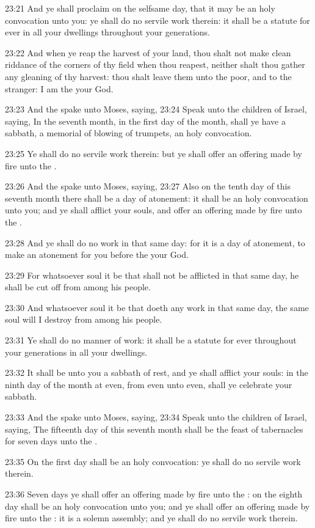 23:21 And ye shall proclaim on the selfsame day, that it may be an holy convocation unto you: ye shall do no servile work therein: it shall be a statute for ever in all your dwellings throughout your generations.

23:22 And when ye reap the harvest of your land, thou shalt not make clean riddance of the corners of thy field when thou reapest, neither shalt thou gather any gleaning of thy harvest: thou shalt leave them unto the poor, and to the stranger: I am the \LORD your God.

23:23 And the \LORD spake unto Moses, saying, 23:24 Speak unto the children of Israel, saying, In the seventh month, in the first day of the month, shall ye have a sabbath, a memorial of blowing of trumpets, an holy convocation.

23:25 Ye shall do no servile work therein: but ye shall offer an offering made by fire unto the \LORD.

23:26 And the \LORD spake unto Moses, saying, 23:27 Also on the tenth day of this seventh month there shall be a day of atonement: it shall be an holy convocation unto you; and ye shall afflict your souls, and offer an offering made by fire unto the \LORD.

23:28 And ye shall do no work in that same day: for it is a day of atonement, to make an atonement for you before the \LORD your God.

23:29 For whatsoever soul it be that shall not be afflicted in that same day, he shall be cut off from among his people.

23:30 And whatsoever soul it be that doeth any work in that same day, the same soul will I destroy from among his people.

23:31 Ye shall do no manner of work: it shall be a statute for ever throughout your generations in all your dwellings.

23:32 It shall be unto you a sabbath of rest, and ye shall afflict your souls: in the ninth day of the month at even, from even unto even, shall ye celebrate your sabbath.

23:33 And the \LORD spake unto Moses, saying, 23:34 Speak unto the children of Israel, saying, The fifteenth day of this seventh month shall be the feast of tabernacles for seven days unto the \LORD.

23:35 On the first day shall be an holy convocation: ye shall do no servile work therein.

23:36 Seven days ye shall offer an offering made by fire unto the \LORD: on the eighth day shall be an holy convocation unto you; and ye shall offer an offering made by fire unto the \LORD: it is a solemn assembly; and ye shall do no servile work therein.


